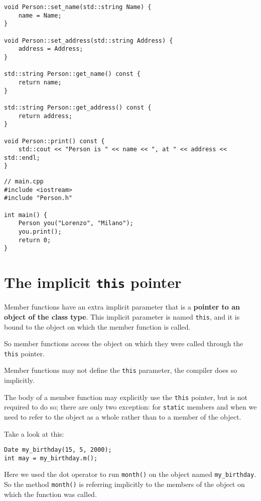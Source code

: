 \begin{enumerate}[$\triangleright$]
\begin{lstlisting}
void Person::set_name(std::string Name) {
    name = Name;
}

void Person::set_address(std::string Address) {
    address = Address;
}

std::string Person::get_name() const {
    return name;
}

std::string Person::get_address() const {
    return address;
}

void Person::print() const {
    std::cout << "Person is " << name << ", at " << address << std::endl;
}
\end{lstlisting}
    \begin{lstlisting}
// main.cpp
#include <iostream>
#include "Person.h"

int main() {
    Person you("Lorenzo", "Milano");
    you.print();
    return 0;
}
\end{lstlisting}
\end{enumerate}


\section{The implicit \texttt{this} pointer} %
\label{sec:the_implicit_this_pointer}

Member functions have an extra implicit parameter that is a \textbf{pointer to an object of the class type}. This implicit parameter is named \texttt{this}, and it is bound to the object on which the member function is called. 

So member functions access the object on which they were called through the \texttt{this} pointer.

\begin{marker}
Member functions may not define the \texttt{this} parameter, the compiler does so implicitly. 

The body of a member function may explicitly use the \texttt{this} pointer, but is not required to do so; there are only two exception: for \texttt{static} members and when we need to refer to the object as a whole rather than to a member of the object. 
\end{marker}

Take a look at this:
\begin{lstlisting}
Date my_birthday(15, 5, 2000);
int may = my_birthday.m();
\end{lstlisting}

Here we used the dot operator to run \texttt{month()} on the object named \texttt{my\_birthday}. So the method \texttt{month()} is referring implicitly to the members of the object on which the function was called.

